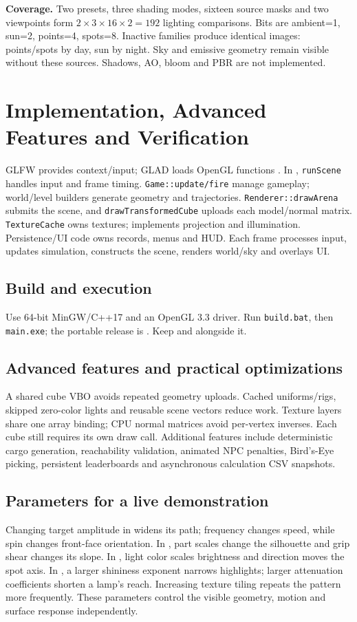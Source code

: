\textbf{Coverage.} Two presets, three shading modes, sixteen source masks and two viewpoints form $2\times3\times16\times2=192$ lighting comparisons. Bits are ambient=1, sun=2, points=4, spots=8. Inactive families produce identical images: points/spots by day, sun by night. Sky and emissive geometry remain visible without these sources. Shadows, AO, bloom and PBR are not implemented.

\section{Implementation, Advanced Features and Verification}
GLFW provides context/input; GLAD loads OpenGL functions \cite{glfw}. In , \texttt{runScene} handles input and frame timing. \texttt{Game::update/fire} manage gameplay; world/level builders generate geometry and trajectories. \texttt{Renderer::drawArena} submits the scene, and \texttt{drawTransformedCube} uploads each model/normal matrix. \texttt{TextureCache} owns textures;  implements projection and illumination. Persistence/UI code owns records, menus and HUD. Each frame processes input, updates simulation, constructs the scene, renders world/sky and overlays UI.
\subsection{Build and execution}
Use 64-bit MinGW/C++17 and an OpenGL 3.3 driver. Run \texttt{build.bat}, then \texttt{main.exe}; the portable release is . Keep  and  alongside it. \subsection{Advanced features and practical optimizations}
A shared cube VBO avoids repeated geometry uploads. Cached uniforms/rigs, skipped zero-color lights and reusable scene vectors reduce work. Texture layers share one array binding; CPU normal matrices avoid per-vertex inverses. Each cube still requires its own draw call. Additional features include deterministic cargo generation, reachability validation, animated NPC penalties, Bird's-Eye picking, persistent leaderboards and asynchronous calculation CSV snapshots.
\subsection{Parameters for a live demonstration}
Changing target amplitude in  widens its path; frequency changes speed, while spin changes front-face orientation. In , part scales change the silhouette and grip shear changes its slope. In , light color scales brightness and direction moves the spot axis. In , a larger shininess exponent narrows highlights; larger attenuation coefficients shorten a lamp's reach. Increasing texture tiling repeats the pattern more frequently. These parameters control the visible geometry, motion and surface response independently.

